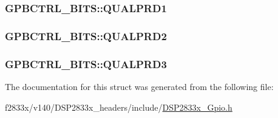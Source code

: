 \subsubsection[{Q\+U\+A\+L\+P\+R\+D1}]{ G\+P\+B\+C\+T\+R\+L\+\_\+\+B\+I\+T\+S\+::\+Q\+U\+A\+L\+P\+R\+D1}\label{struct_g_p_b_c_t_r_l___b_i_t_s_a216f7b8ca8d9fa96d23741c4b9190ea2}
\hypertarget{struct_g_p_b_c_t_r_l___b_i_t_s_a8b723bb2b411f273b3b59aa884e1eafb}{}
\subsubsection[{Q\+U\+A\+L\+P\+R\+D2}]{ G\+P\+B\+C\+T\+R\+L\+\_\+\+B\+I\+T\+S\+::\+Q\+U\+A\+L\+P\+R\+D2}\label{struct_g_p_b_c_t_r_l___b_i_t_s_a8b723bb2b411f273b3b59aa884e1eafb}
\hypertarget{struct_g_p_b_c_t_r_l___b_i_t_s_afc42dd388f56ff09ad55f7ea03070168}{}
\subsubsection[{Q\+U\+A\+L\+P\+R\+D3}]{ G\+P\+B\+C\+T\+R\+L\+\_\+\+B\+I\+T\+S\+::\+Q\+U\+A\+L\+P\+R\+D3}\label{struct_g_p_b_c_t_r_l___b_i_t_s_afc42dd388f56ff09ad55f7ea03070168}


The documentation for this struct was generated from the following file\+:\begin{DoxyCompactItemize}
\item 
f2833x/v140/\+D\+S\+P2833x\+\_\+headers/include/\hyperlink{_d_s_p2833x___gpio_8h}{D\+S\+P2833x\+\_\+\+Gpio.\+h}\end{DoxyCompactItemize}
